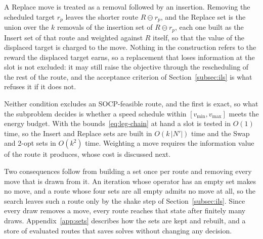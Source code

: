 \documentclass[11pt]{article}
\begin{document}
A Replace move is treated as a removal followed by an insertion. Removing the scheduled target $r_p$ leaves the shorter route $R \ominus r_p$, and the Replace set is the union over the $k$ removals of the insertion set of $R \ominus r_p$, each one built as the Insert set of that route and weighted against $R$ itself, so that the value of the displaced target is charged to the move. Nothing in the construction refers to the reward the displaced target earns, so a replacement that loses information at the slot is not excluded: it may still raise the objective through the rescheduling of the rest of the route, and the acceptance criterion of Section~\ref{subsec:ils} is what refuses it if it does not.

Neither condition excludes an SOCP-feasible route, and the first is exact, so what the subproblem decides is whether a speed schedule within $[v_{\min}, v_{\max}]$ meets the energy budget. With the bounds~\eqref{eq:leg-chain} at hand a slot is tested in $O(1)$ time, so the Insert and Replace sets are built in $O(k\,|N'|)$ time and the Swap and 2-opt sets in $O(k^2)$ time. Weighting a move requires the information value of the route it produces, whose cost is discussed next.

Two consequences follow from building a set once per route and removing every move that is drawn from it. An iteration whose operator has an empty set makes no move, and a route whose four sets are all empty admits no move at all, so the search leaves such a route only by the shake step of Section~\ref{subsec:ils}. Since every draw removes a move, every route reaches that state after finitely many draws. Appendix~\ref{app:sets} describes how the sets are kept and rebuilt, and a store of evaluated routes that saves solves without changing any decision.
\end{document}
